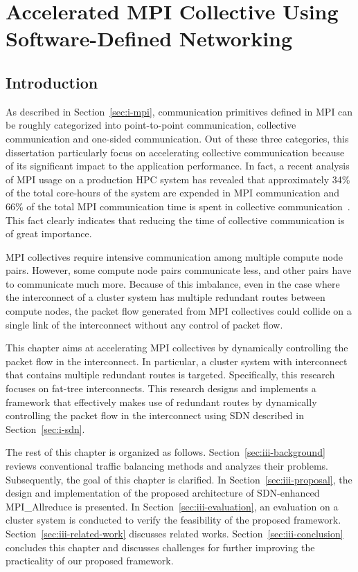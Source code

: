 \chapter{Accelerated MPI Collective Using Software-Defined Networking}\label{sec:iii}

\section{Introduction}\label{sec:iii-introduction}

As described in Section~\ref{sec:i-mpi}, communication primitives defined in
MPI can be roughly categorized into point-to-point communication, collective
communication and one-sided communication. Out of these three categories, this
dissertation particularly focus on accelerating collective communication
because of its significant impact to the application performance. In fact, a
recent analysis of MPI usage on a production HPC system has revealed that
approximately 34\% of the total core-hours of the system are expended in MPI
communication and 66\% of the total MPI communication time is spent in
collective communication~\autocite{Chunduri2018}. This fact clearly indicates
that reducing the time of collective communication is of great importance.

MPI collectives require intensive communication among multiple compute node
pairs. However, some compute node pairs communicate less, and other pairs have
to communicate much more. Because of this imbalance, even in the case where
the interconnect of a cluster system has multiple redundant routes between
compute nodes, the packet flow generated from MPI collectives could collide on
a single link of the interconnect without any control of packet flow.

This chapter aims at accelerating MPI collectives by dynamically
controlling the packet flow in the interconnect. In particular, a
cluster system with interconnect that contains multiple redundant routes is
targeted. Specifically, this research focuses on fat-tree interconnects. This
research designs and implements a framework that effectively makes use of
redundant routes by dynamically controlling the packet flow in the
interconnect using SDN described in Section~\ref{sec:i-sdn}.

The rest of this chapter is organized as follows.
Section~\ref{sec:iii-background} reviews conventional traffic balancing
methods and analyzes their problems. Subsequently, the goal of this chapter is
clarified. In Section~\ref{sec:iii-proposal}, the design and implementation of
the proposed architecture of SDN-enhanced MPI\_Allreduce is presented. In
Section~\ref{sec:iii-evaluation}, an evaluation on a cluster system is
conducted to verify the feasibility of the proposed framework.
Section~\ref{sec:iii-related-work} discusses related works.
Section~\ref{sec:iii-conclusion} concludes this chapter and discusses
challenges for further improving the practicality of our proposed framework.

